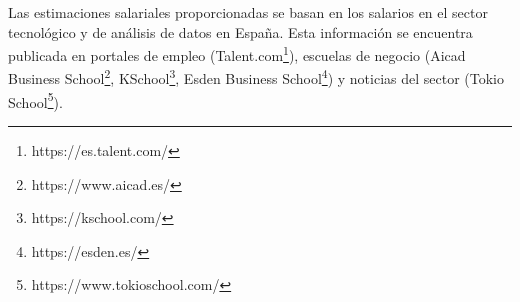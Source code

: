 Las estimaciones salariales proporcionadas se basan en los salarios en el sector tecnológico y de análisis de datos en España. Esta información se encuentra publicada en portales de empleo (Talent.com\footnote{https://es.talent.com/}), escuelas de negocio (Aicad Business School\footnote{https://www.aicad.es/}, KSchool\footnote{https://kschool.com/}, Esden Business School\footnote{https://esden.es/}) y noticias del sector (Tokio School\footnote{https://www.tokioschool.com/}). 










